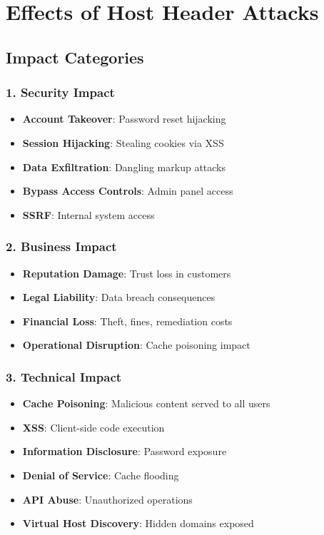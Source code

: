 \documentclass[12pt,a4paper]{article}
\begin{document}
\section{Effects of Host Header Attacks}

\subsection{Impact Categories}

\subsubsection{1. Security Impact}
\begin{itemize}
    \item \textbf{Account Takeover}: Password reset hijacking
    \item \textbf{Session Hijacking}: Stealing cookies via XSS
    \item \textbf{Data Exfiltration}: Dangling markup attacks
    \item \textbf{Bypass Access Controls}: Admin panel access
    \item \textbf{SSRF}: Internal system access
\end{itemize}

\subsubsection{2. Business Impact}
\begin{itemize}
    \item \textbf{Reputation Damage}: Trust loss in customers
    \item \textbf{Legal Liability}: Data breach consequences
    \item \textbf{Financial Loss}: Theft, fines, remediation costs
    \item \textbf{Operational Disruption}: Cache poisoning impact
\end{itemize}

\subsubsection{3. Technical Impact}
\begin{itemize}
    \item \textbf{Cache Poisoning}: Malicious content served to all users
    \item \textbf{XSS}: Client-side code execution
    \item \textbf{Information Disclosure}: Password exposure
    \item \textbf{Denial of Service}: Cache flooding
    \item \textbf{API Abuse}: Unauthorized operations
    \item \textbf{Virtual Host Discovery}: Hidden domains exposed
\end{itemize}
\end{document}
